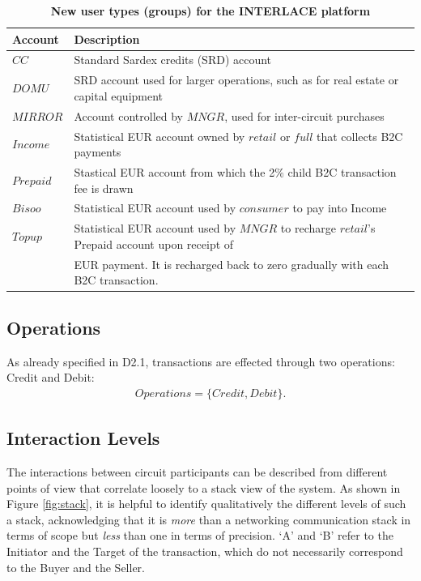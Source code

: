 \setlength{\tabcolsep}{10pt}
\begin{table}[htbp]
\begin{centering}
\small
{
\begin{tabular}{| l | l | }
\hline
\textbf{Account}	& \textbf{Description} \\
\hline
$CC$ & Standard Sardex credits (SRD) account \\
\hline
$DOMU$ & SRD account used for larger operations, such as for real estate or capital equipment\\
\hline
$MIRROR$ & Account controlled by $MNGR$, used for inter-circuit purchases \\
\hline
$Income$ & Statistical EUR account owned by $retail$ or $full$ that collects B2C payments\\
\hline
$Prepaid$ & Stastical EUR account from which the 2\% child B2C transaction fee is drawn \\
\hline
$Bisoo$ & Statistical EUR account used by $consumer$ to pay into Income \\
\hline
$Topup$ & Statistical EUR account used by $MNGR$ to recharge $retail$'s Prepaid account upon receipt of \\
&\hspace{0.5cm} EUR payment. It is recharged back to zero gradually with each B2C transaction. \\
\hline
\end{tabular}
}
\caption{\small\textbf{New user types (groups) for the INTERLACE platform}}
\label{tab:accounts}
\vspace{-0.5cm}
\end{centering}
\end{table}

\subsection{Operations}
As already specified in D2.1, transactions are effected through two operations: Credit and Debit:
\begin{align}
Operations = \{ Credit, Debit \}.
\end{align}

\subsection{Interaction Levels}
The interactions between circuit participants can be described from different points of view that correlate loosely to a stack view of the system. As shown in Figure \ref{fig:stack}, it is helpful to identify qualitatively the different levels of such a stack, acknowledging that it is \emph{more} than a networking communication stack in terms of scope but \emph{less} than one in terms of precision. `A' and `B' refer to the Initiator and the Target of the transaction, which do not necessarily correspond to the Buyer and the Seller.

